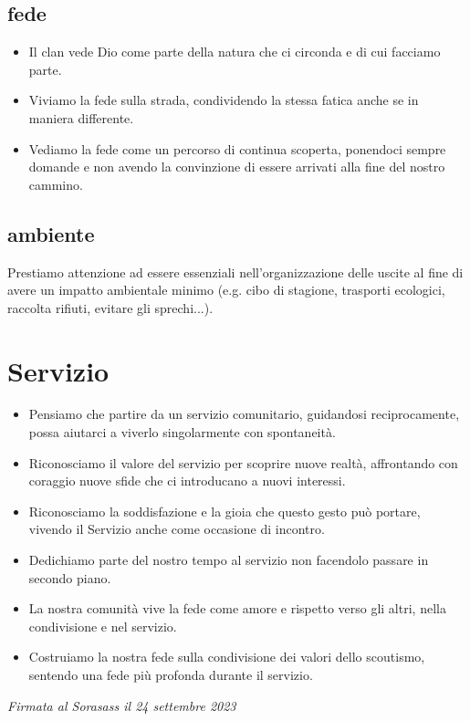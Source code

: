 \documentclass[12pt]{report}
\begin{document}
		\section*{fede}
		\begin{itemize}
			\item Il clan vede Dio come parte della natura che ci circonda e di 
			cui facciamo parte.
			\item Viviamo la fede sulla strada, condividendo la stessa fatica 
			anche se in maniera differente.
			\item Vediamo la fede come un percorso di continua scoperta, 
			ponendoci sempre domande e non avendo la convinzione di essere 
			arrivati alla fine del nostro cammino.
		\end{itemize}
		
		\section*{ambiente}
		Prestiamo attenzione ad essere essenziali nell'organizzazione delle 
		uscite al fine di avere un impatto ambientale minimo (e.g. cibo di 
		stagione, trasporti ecologici, raccolta rifiuti, 
		evitare gli sprechi...).
	
	\chapter*{Servizio}
		\begin{itemize}
			\item Pensiamo che partire da un servizio comunitario, 
			guidandosi reciprocamente, possa aiutarci a viverlo singolarmente 
			con spontaneità.
			\item Riconosciamo il valore del servizio per scoprire nuove 
			realtà, affrontando con coraggio nuove sfide che ci introducano a 
			nuovi interessi.
			\item Riconosciamo la soddisfazione e la gioia che questo gesto può 
			portare, vivendo il Servizio anche come occasione di incontro.
			\item Dedichiamo parte del nostro tempo al servizio non facendolo 
			passare in secondo piano.
			\item La nostra comunità vive la fede come amore e rispetto verso 
			gli altri, nella condivisione e nel servizio.
			\item Costruiamo la nostra fede sulla condivisione dei valori dello 
			scoutismo, sentendo una fede più profonda durante il servizio. 
		\end{itemize}
		
		\vspace*{\fill}
		\begin{flushright}
			\itshape
			Firmata al Sorasass il 24 settembre 2023
		\end{flushright}
\end{document}
